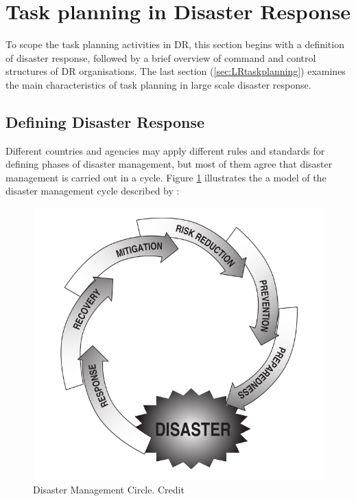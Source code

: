 \section{Task planning in Disaster Response}\label{sec:lrplanning}
To scope the task planning activities in \ac{DR}, this section begins with a definition of disaster response, followed by a brief overview of command and control structures of \ac{DR} organisations. The last section (\ref{sec:LRtaskplanning}) examines the main characteristics of task planning in large scale disaster response.\\

\subsection{Defining Disaster Response}
Different countries and agencies may apply different rules and standards for defining phases of disaster management, but most of them agree that disaster management is carried out in a cycle. Figure \ref{fig:drCircle} illustrates the a model of the disaster management cycle described by \citep{Wattegama2012}:\\

\begin{figure}[h]
  \centering
  \includegraphics[width=1\textwidth]{img/Background/drCircle}
  \caption{Disaster Management Circle. Credit \cite{Wattegama2012}}
  \label{fig:drCircle}
\end{figure}

